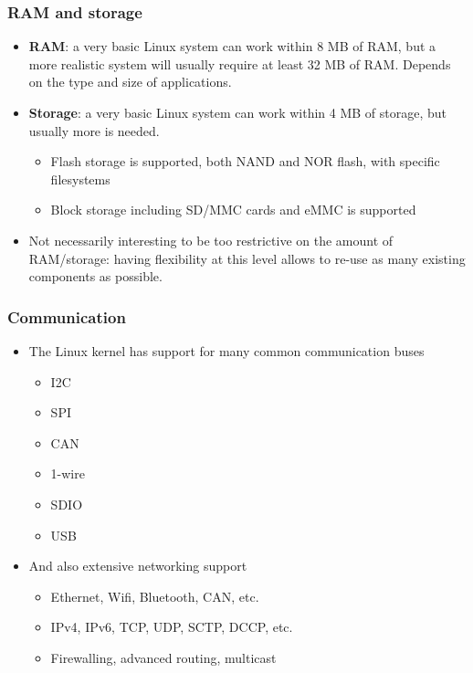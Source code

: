 \begin{frame}
  \frametitle{RAM and storage}
  \begin{itemize}
  \item {\bf RAM}: a very basic Linux system can work within 8 MB of
    RAM, but a more realistic system will usually require at least 32
    MB of RAM. Depends on the type and size of applications.
  \item {\bf Storage}: a very basic Linux system can work within 4 MB
    of storage, but usually more is needed.
    \begin{itemize}
    \item Flash storage is supported, both NAND and NOR flash, with
      specific filesystems
    \item Block storage including SD/MMC cards and eMMC is supported
    \end{itemize}
  \item Not necessarily interesting to be too restrictive on the
    amount of RAM/storage: having flexibility at this level allows to
    re-use as many existing components as possible.
  \end{itemize}
\end{frame}

\begin{frame}
  \frametitle{Communication}
  \begin{itemize}
  \item The Linux kernel has support for many common communication
    buses
    \begin{itemize}
    \item I2C
    \item SPI
    \item CAN
    \item 1-wire
    \item SDIO
    \item USB
    \end{itemize}
  \item And also extensive networking support
    \begin{itemize}
    \item Ethernet, Wifi, Bluetooth, CAN, etc.
    \item IPv4, IPv6, TCP, UDP, SCTP, DCCP, etc.
    \item Firewalling, advanced routing, multicast
    \end{itemize}
  \end{itemize}
\end{frame}

